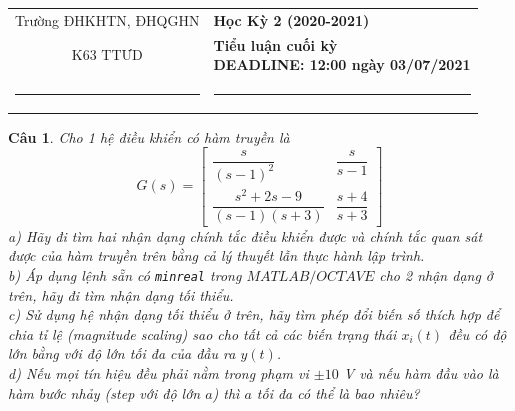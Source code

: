 \documentclass[11pt]{article}
\newtheorem{bt}{Câu}
\newcommand{\m}[1]{
	\begin{bmatrix}
		#1 
	\end{bmatrix}
}
\begin{document}
\begin{tabular*}
{\linewidth}{c>{\centering\hspace{0pt}} p{}}
Trường ĐHKHTN, ĐHQGHN & {\bf Học Kỳ 2 (2020-2021)}
\tabularnewline
K63 TTƯD & {\bf Tiểu luận cuối kỳ \\ DEADLINE: 12:00 ngày 03/07/2021}
\tabularnewline
\rule{1in}{1pt}  \small  & \rule{2in}{1pt} %
\tabularnewline

\end{tabular*}
%

\begin{bt} Cho 1 hệ điều khiển có hàm truyền là 
	\[
	G(s) = \m{\dfrac{s}{(s-1)^2} & \dfrac{s}{s-1} \\ \dfrac{s^2+2s-9}{(s-1)(s+3)} & \dfrac{s+4}{s+3} }
	\]
	a) Hãy đi tìm hai nhận dạng chính tắc điều khiển được và chính tắc quan sát được của hàm truyền trên bằng cả lý thuyết lẫn thực hành lập trình. \\
	b) Áp dụng lệnh sẵn có \verb|minreal| trong $MATLAB/OCTAVE$ cho 2 nhận dạng ở trên, hãy đi tìm nhận dạng tối thiểu.  \\
	c) Sử dụng hệ nhận dạng tối thiểu ở trên, hãy tìm phép đổi biến số thích hợp để chia tỉ lệ (magnitude scaling) sao cho tất cả các biến trạng thái $x_i(t)$ đều có độ lớn bằng với độ lớn tối đa của đầu ra $y(t)$. \\
	d) Nếu mọi tín hiệu đều phải nằm trong phạm vi $\pm10$ V và nếu hàm đầu vào là hàm bước nhảy (step với độ lớn $a$) thì $a$ tối đa có thể là bao nhiêu? 	
\end{bt}
\end{document}
